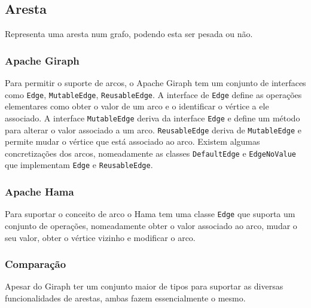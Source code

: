 \subsection{Aresta}
Representa uma aresta num grafo, podendo esta ser pesada ou não.

\subsubsection*{Apache Giraph}
Para permitir o suporte de arcos, o Apache Giraph tem um conjunto de interfaces como \texttt{Edge}, \texttt{MutableEdge}, \texttt{ReusableEdge}. A interface de \texttt{Edge} define as operações
elementares como obter o valor de um arco e o identificar o vértice a ele associado. A interface \texttt{MutableEdge} deriva da interface \texttt{Edge} e define
um método para alterar o valor associado a um arco. \texttt{ReusableEdge} deriva de \texttt{MutableEdge} e permite mudar o vértice que está associado ao arco.
Existem algumas concretizações dos arcos, nomeadamente as classes \texttt{DefaultEdge} e \texttt{EdgeNoValue} que implementam \texttt{Edge} e \texttt{ReusableEdge}.

\subsubsection*{Apache Hama}
Para suportar o conceito de arco o Hama tem uma classe \texttt{Edge} que suporta um conjunto de operações, nomeadamente obter o valor associado ao arco, mudar o seu valor,
obter o vértice vizinho e modificar o arco. 

\subsubsection*{Comparação}
Apesar do Giraph ter um conjunto maior de tipos para suportar as diversas funcionalidades de arestas, ambas fazem essencialmente
o mesmo.